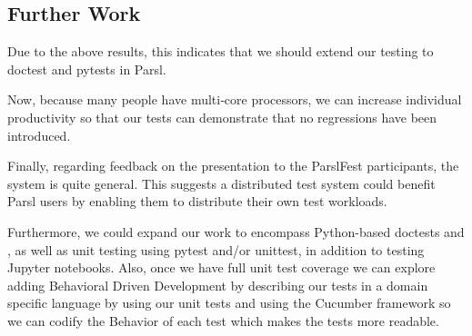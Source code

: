 
\subsection{Further Work}

Due to the above results, this indicates that we should extend our testing to doctest and pytests in Parsl.

Now, because many people have multi‑core processors, we can increase individual productivity so that our tests can demonstrate that no regressions have been introduced.

Finally, regarding feedback on the presentation to the ParslFest participants, the system is quite general. This suggests a distributed test system could benefit Parsl users by enabling them to distribute their own test workloads.

Furthermore, we could expand our work to encompass Python-based doctests and , as well as unit testing using pytest and/or unittest, in addition to testing Jupyter notebooks. Also, once we have full unit test coverage we can explore adding Behavioral Driven Development by describing our tests in a domain specific language by using our unit tests and using the Cucumber framework so we can codify the Behavior of each test which makes the tests more readable.







